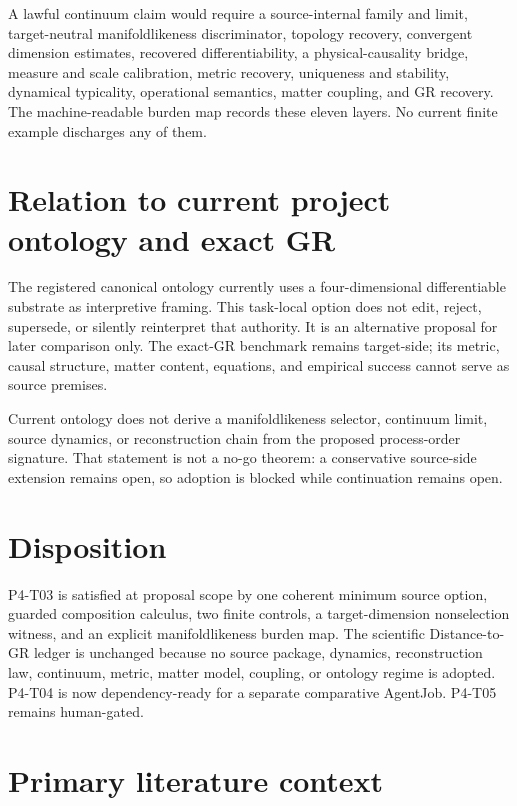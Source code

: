 \documentclass[11pt]{article}
\begin{document}
A lawful continuum claim would require a source-internal family and limit,
target-neutral manifoldlikeness discriminator, topology recovery, convergent
dimension estimates, recovered differentiability, a physical-causality bridge,
measure and scale calibration, metric recovery, uniqueness and stability,
dynamical typicality, operational semantics, matter coupling, and GR recovery.
The machine-readable burden map records these eleven layers. No current finite
example discharges any of them.

\section{Relation to current project ontology and exact GR}

The registered canonical ontology currently uses a four-dimensional
differentiable substrate as interpretive framing. This task-local option does
not edit, reject, supersede, or silently reinterpret that authority. It is an
alternative proposal for later comparison only. The exact-GR benchmark remains
target-side; its metric, causal structure, matter content, equations, and
empirical success cannot serve as source premises.

Current ontology does not derive a manifoldlikeness selector, continuum limit,
source dynamics, or reconstruction chain from the proposed process-order
signature. That statement is not a no-go theorem: a conservative source-side
extension remains open, so adoption is blocked while continuation remains open.

\section{Disposition}

P4-T03 is satisfied at proposal scope by one coherent minimum source option,
guarded composition calculus, two finite controls, a target-dimension
nonselection witness, and an explicit manifoldlikeness burden map. The
scientific Distance-to-GR ledger is unchanged because no source package,
dynamics, reconstruction law, continuum, metric, matter model, coupling, or
ontology regime is adopted. P4-T04 is now dependency-ready for a separate
comparative AgentJob. P4-T05 remains human-gated.

\section*{Primary literature context}
\end{document}
